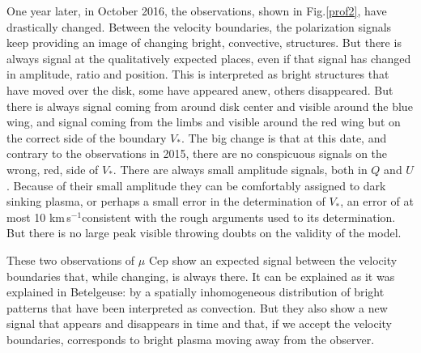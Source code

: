 \documentclass{/Users/art2/TeX/aanda/aa}
\def\kms {km\,s$^{-1}$}
\begin{document}
One year later, in October 2016, the observations, shown in Fig.\ref{prof2}, have drastically changed. Between the velocity boundaries, the polarization signals keep providing an image of changing bright, convective, structures. But there is always signal at the qualitatively expected places, even if that signal has changed in amplitude, ratio and position. This is interpreted as bright structures that have moved over the disk, some have appeared anew, others disappeared. But there is always signal coming from around disk center and visible around the blue wing, and signal coming from the limbs and visible around the red wing but on the correct side of the boundary $V_*$. The big change is that at this date, and contrary to the observations in 2015, there are no conspicuous signals on the wrong, red, side of $V_*$. There are always small amplitude signals, both in $Q$ and $U$. Because of their small amplitude they can be comfortably assigned to dark sinking plasma, or perhaps a small error in the determination of $V_*$, an error of at most 10 \kms consistent with the rough arguments used to its determination. But there is no large peak visible throwing doubts on the validity of the model.

These two observations of $\mu$ Cep show an expected signal between the velocity boundaries that, while changing, is always there. It can be explained as it was explained in Betelgeuse: by a spatially inhomogeneous distribution of bright patterns that have been interpreted as convection. But they also show a new signal  that appears and disappears in time and that, if we accept the velocity boundaries, corresponds to bright plasma moving away from the observer.
\end{document}
